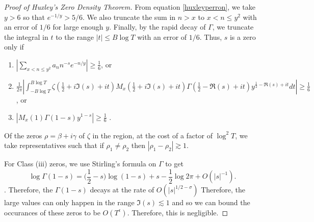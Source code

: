 \begin{proof}[Proof of Huxley's Zero Density Theorem]
    From equation \ref{huxleyperron}, we take $y>6$ so that $e^{-1/y}>5/6$. We also truncate the sum in $n>x$ to $x<n\leq y^2$ with an error of $1/6$ for large enough $y$. Finally, by the rapid decay of $\Gamma$, we truncate the integral in $t$ to the range $|t|\leq B\log T$ with an error of $1/6$. Thus, $s$ is a zero only if \begin{enumerate}[label=(\roman{*})]
        \item $|\sum_{x<n\leq y^2}a_n n^{-s} e^{-n/y}|\geq \frac{1}{6}$, or
        \item $\frac{1}{2\pi}|\int_{-B\log T}^{B\log T}\zeta(\frac{1}{2}+i\Im(s)+it)M_x(\frac{1}{2}+i\Im(s)+it) \Gamma\left(\frac{1}{2}-\Re(s)+it\right) y^{\frac{1}{2}-\Re(s)+it} dt|\geq \frac{1}{6}$, or
        \item $|M_x(1)\Gamma(1-s)y^{1-s}|\geq \frac{1}{6}$ .
    \end{enumerate}
    Of the zeros $\rho = \beta+i\gamma$ of $\zeta$ in the region, at the cost of a factor of $\log^2 T$, we take representatives such that if $\rho_1\neq \rho_2$ then $|\rho_1-\rho_2|\gtrsim 1$. 

    For Class (iii) zeros, we use Stirling's formula on $\Gamma$ to get \[
        \log \Gamma(1-s) = \bigg(\frac{1}{2}-s\bigg)\log (1-s) + s - \frac{1}{2}\log 2\pi + O(|s|^{-1}).
    \]. Therefore, the $\Gamma(1-s)$ decays at the rate of $O(|s|^{1/2-\sigma})$ Therefore, the large values can only happen in the range $\Im (s)\lesssim 1$ and so we can bound the occurances of these zeros to be $O(T^\epsilon)$. Therefore, this is negligible.


\end{proof}

